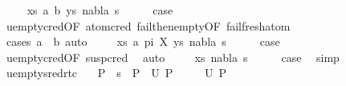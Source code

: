 \begin{isabellebody}
\isanewline
\ \ \isamarkupfalse%
\ {\isacharparenleft}{\kern0pt}{}\ xs\ a\ b\ ys\ nabla\ s{\isacharparenright}{\kern0pt}\isanewline
\ \ \isamarkupfalse%
\ \isamarkupfalse%
\ {\isacharquery}{\kern0pt}case\ \isanewline
\ \ \ \ \isamarkupfalse%
\ u{\isacharunderscore}{\kern0pt}empty{\isacharunderscore}{\kern0pt}cred{\isacharbrackleft}{\kern0pt}OF\ atom{\isacharunderscore}{\kern0pt}cred{\isacharbrackright}{\kern0pt}\ fail{\isacharunderscore}{\kern0pt}then{\isacharunderscore}{\kern0pt}empty{\isacharbrackleft}{\kern0pt}OF\ fail{\isacharunderscore}{\kern0pt}fresh{\isacharunderscore}{\kern0pt}atom{\isacharbrackright}{\kern0pt}\isanewline
\ \ \ \ \isamarkupfalse%
\ {\isacharparenleft}{\kern0pt}cases\ {\isachardoublequoteopen}a\ {\isacharequal}{\kern0pt}\ b{\isachardoublequoteclose}{\isacharparenright}{\kern0pt}\ auto\isanewline
{}\isamarkupfalse%
\isanewline
\ \ \isamarkupfalse%
\ {\isacharparenleft}{\kern0pt}{}\ xs\ a\ pi\ X\ ys\ nabla\ s{\isacharparenright}{\kern0pt}\isanewline
\ \ \isamarkupfalse%
\ \isamarkupfalse%
\ {\isacharquery}{\kern0pt}case\ \isamarkupfalse%
\ u{\isacharunderscore}{\kern0pt}empty{\isacharunderscore}{\kern0pt}cred{\isacharbrackleft}{\kern0pt}OF\ susp{\isacharunderscore}{\kern0pt}cred{\isacharbrackright}{\kern0pt}\ \isamarkupfalse%
\ auto\isanewline
{}\isamarkupfalse%
\isanewline
\ \ \isamarkupfalse%
\ {\isacharparenleft}{\kern0pt}{}\ xs\ nabla\ s{\isacharparenright}{\kern0pt}\isanewline
\ \ \isamarkupfalse%
\ \isamarkupfalse%
\ {\isacharquery}{\kern0pt}case\ \isamarkupfalse%
\ simp\isanewline
{}\isamarkupfalse%
%
\endisatagproof
{\isafoldproof}%
%
\isadelimproof
\isanewline
%
\endisadelimproof
\isanewline
{}\isamarkupfalse%
\ u{\isacharunderscore}{\kern0pt}empty{\isacharunderscore}{\kern0pt}sred{\isacharunderscore}{\kern0pt}rtc{\isacharcolon}{\kern0pt}\isanewline
\ \ \ {\isachardoublequoteopen}P{}\ {\isasymturnstile}\ s\ {\isasymleadsto}\isactrlsup {\isacharasterisk}{\kern0pt}\ P{}{\isachardoublequoteclose}\ \ {\isachardoublequoteopen}U\ P{}\ {\isacharequal}{\kern0pt}\ {\isacharbraceleft}{\kern0pt}{\isacharbraceright}{\kern0pt}{\isachardoublequoteclose}\isanewline
\ \ \ {\isachardoublequoteopen}U\ P{}\ {\isacharequal}{\kern0pt}\ {\isacharbraceleft}{\kern0pt}{\isacharbraceright}{\kern0pt}{\isachardoublequoteclose}\isanewline

\end{isabellebody}
